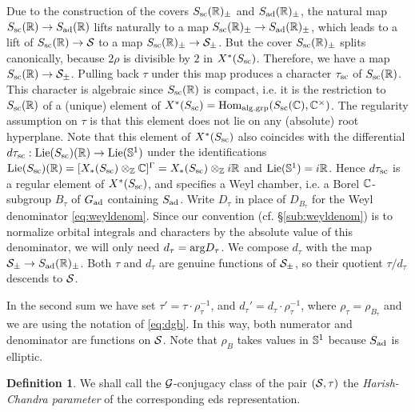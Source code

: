 \documentclass{article}
\theoremstyle{definition}
\newtheorem{dfn}[thm]{Definition}
\numberwithin{equation}{section}
\renewcommand{\-}{\hyp{}}
\begin{document}
Due to the construction of the covers $S_{\textrm{sc}}(\mathbb{R})_\pm$ and $S_{\textrm{ad}}(\mathbb{R})_\pm$, the natural map $S_{\textrm{sc}}(\mathbb{R}) \to S_{\textrm{ad}}(\mathbb{R})$ lifts naturally to a map $S_{\textrm{sc}}(\mathbb{R})_\pm \to S_{\textrm{ad}}(\mathbb{R})_\pm$, which leads to a lift of $S_{\textrm{sc}}(\mathbb{R}) \to \mathcal{S}$ to a map $S_{\textrm{sc}}(\mathbb{R})_\pm \to \mathcal{S}_\pm$. But the cover $S_{\textrm{sc}}(\mathbb{R})_\pm$ splits canonically, because $2\rho$ is divisible by $2$ in $X^*(S_{\textrm{sc}})$. Therefore, we have a map $S_{\textrm{sc}}(\mathbb{R}) \to \mathcal{S}_\pm$. Pulling back $\tau$ under this map produces a character $\tau_{\textrm{sc}}$ of $S_{\textrm{sc}}(\mathbb{R})$. This character is algebraic since $S_{\textrm{sc}}(\mathbb{R})$ is compact, i.e. it is the restriction to $S_{\textrm{sc}}(\mathbb{R})$ of a (unique) element of  $X^*(S_{\textrm{sc}})=\textrm{Hom}_{\textrm{alg.grp}}(S_{\textrm{sc}}(\mathbb{C}),\mathbb{C}^\times)$. The regularity assumption on $\tau$ is that this element does not lie on any (absolute) root hyperplane. Note that this element of $X^*(S_{\textrm{sc}})$ also coincides with the differential $d\tau_{\textrm{sc}} : \textrm{Lie}(S_{\textrm{sc}})(\mathbb{R}) \to \textrm{Lie}(\mathbb{S}^1)$ under the identifications $\textrm{Lie}(S_{\textrm{sc}})(\mathbb{R})=[X_*(S_{\textrm{sc}}) \otimes_{\mathbb{Z}} \mathbb{C}]^\Gamma = X_*(S_{\textrm{sc}})\otimes_{\mathbb{Z}} i\mathbb{R}$ and $\textrm{Lie}(\mathbb{S}^1)=i\mathbb{R}$. Hence $d\tau_{\textrm{sc}}$ is a regular element of $X^*(S_{\textrm{sc}})$, and specifies a Weyl chamber, i.e. a Borel $\mathbb{C}$-subgroup $B_\tau$ of $G_{\textrm{ad}}$ containing $S_{\textrm{ad}}$. Write $D_\tau$ in place of $D_{B_\tau}$ for the Weyl denominator \eqref{eq:weyldenom}. Since our convention (cf. \S\ref{sub:weyldenom}) is to normalize orbital integrals and characters by the absolute value of this denominator, we will only need $d_\tau=\textrm{arg}D_\tau$. We compose $d_\tau$ with the map $\mathcal{S}_\pm \to S_{\textrm{ad}}(\mathbb{R})_\pm$. Both $\tau$ and $d_\tau$ are genuine functions of $\mathcal{S}_\pm$, so their quotient $\tau/d_\tau$ descends to $\mathcal{S}$.

In the second sum we have set $\tau'=\tau \cdot \rho_\tau^{-1}$, and $d_\tau'=d_\tau \cdot \rho_\tau^{-1}$, where $\rho_\tau=\rho_{B_\tau}$
and we are using the notation of \eqref{eq:dgb}. In this way, both numerator and denominator are functions on $\mathcal{S}$. Note that $\rho_B$ takes values in $\mathbb{S}^1$ because $S_{\textrm{ad}}$ is elliptic.

\begin{dfn} \label{dfn:hcpar}
	We shall call the $\mathcal{G}$-conjugacy class of the pair $(\mathcal{S},\tau)$ the \emph{Harish-Chandra parameter} of the corresponding eds representation.
\end{dfn}
\end{document}
